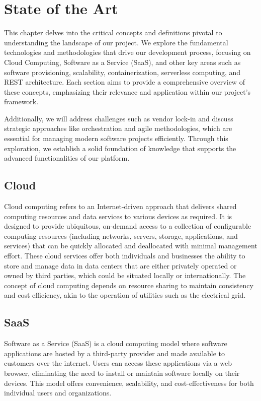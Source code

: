 \chapter{State of the Art}

This chapter delves into the critical concepts and definitions pivotal to understanding the landscape of our project. We explore the fundamental technologies and methodologies that drive our development process, focusing on Cloud Computing, Software as a Service (SaaS), and other key areas such as software provisioning, scalability, containerization, serverless computing, and REST architecture. Each section aims to provide a comprehensive overview of these concepts, emphasizing their relevance and application within our project's framework.

Additionally, we will address challenges such as vendor lock-in and discuss strategic approaches like orchestration and agile methodologies, which are essential for managing modern software projects efficiently. Through this exploration, we establish a solid foundation of knowledge that supports the advanced functionalities of our platform.

\pagebreak

\section{Cloud}
Cloud computing refers to an Internet-driven approach that delivers shared computing resources and data services to various devices as required. It is designed to provide ubiquitous, on-demand access to a collection of configurable computing resources (including networks, servers, storage, applications, and services) that can be quickly allocated and deallocated with minimal management effort. These cloud services offer both individuals and businesses the ability to store and manage data in data centers that are either privately operated or owned by third parties, which could be situated locally or internationally. The concept of cloud computing depends on resource sharing to maintain consistency and cost efficiency, akin to the operation of utilities such as the electrical grid.


\section{SaaS}
Software as a Service (SaaS) is a cloud computing model where software applications are hosted by a third-party provider and made available to customers over the internet. Users can access these applications via a web browser, eliminating the need to install or maintain software locally on their devices. This model offers convenience, scalability, and cost-effectiveness for both individual users and organizations.

